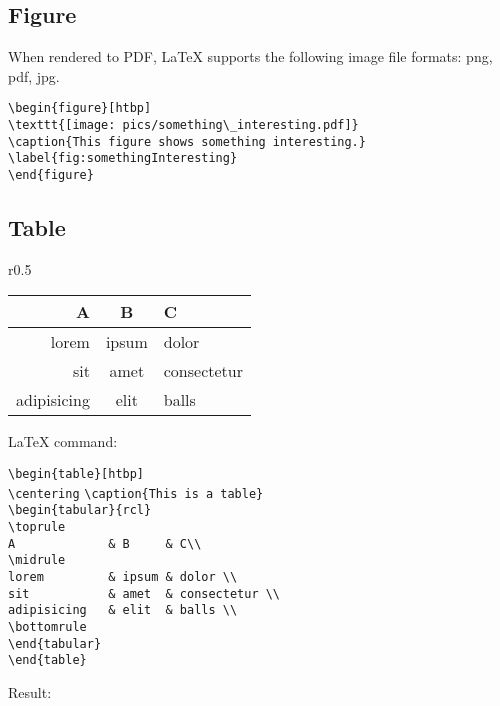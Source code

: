 \documentclass{article}
\begin{document}
\subsection{Figure}

When rendered to PDF, \LaTeX{} supports the following image file formats: png, pdf, jpg.

\noindent\verb|\begin{figure}[htbp]|\\
\verb|\texttt{[image: pics/something\_interesting.pdf]}|\\
\verb|\caption{This figure shows something interesting.}|\\
\verb|\label{fig:somethingInteresting}|\\
\verb|\end{figure}|

\newpage
\subsection{Table}

\begin{wraptable}[0]{r}{0.5\textwidth}
\centering
\caption{This is a table}
\begin{tabular}{rcl}
\toprule
A             & B     & C \\
\midrule
lorem         & ipsum & dolor \\
sit           & amet  & consectetur \\
adipisicing   & elit  & balls \\
\bottomrule
\end{tabular}
\end{wraptable}
\begin{minipage}[t]{0.55\textwidth}
{\LaTeX} command:
\vspace{3mm}

\verb|\begin{table}[htbp]|\\
\verb|\centering|
\verb|\caption{This is a table}|\\
\verb|\begin{tabular}{rcl}|\\
\verb|\toprule|\\
\verb|A             & B     & C\\|\\
\verb|\midrule|\\
\verb|lorem         & ipsum & dolor \\|\\
\verb|sit           & amet  & consectetur \\|\\
\verb|adipisicing   & elit  & balls \\|\\
\verb|\bottomrule|\\
\verb|\end{tabular}|\\
\verb|\end{table}|\\
\end{minipage}
\begin{minipage}[t]{0.45\textwidth}
Result:
\end{minipage}
\end{document}
